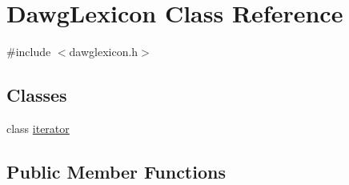 \hypertarget{classDawgLexicon}{}\section{Dawg\+Lexicon Class Reference}
\label{classDawgLexicon}


{\ttfamily \#include $<$dawglexicon.\+h$>$}

\subsection*{Classes}
\begin{DoxyCompactItemize}
\item 
class \mbox{\hyperlink{classDawgLexicon_1_1iterator}{iterator}}
\end{DoxyCompactItemize}
\subsection*{Public Member Functions}
